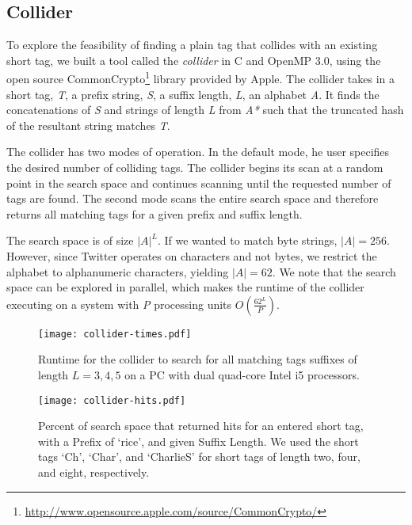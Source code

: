 \subsection{Collider}
\label{sec:collider}

To explore the feasibility of finding a plain tag that collides with an
existing short tag, we built a tool called the {\em collider} in C and
OpenMP 3.0, using the open source CommonCrypto\footnote{\url{http://www.opensource.apple.com/source/CommonCrypto/}} library provided
by Apple.
The collider takes in a short tag, \textit{T}, a prefix string,
\textit{S}, a suffix length, \textit{L}, an alphabet \textit{A}. It
finds the concatenations of \textit{S} and strings of length \textit{L}
from \textit{A*} such that the truncated hash of the resultant string
matches \textit{T}.

The collider has two modes of operation. In the default mode, he user
specifies the desired number of colliding tags. The collider begins its
scan at a random point in the search space and continues scanning until
the requested number of tags are found. The second mode scans the entire
search space and therefore returns all matching tags for a given prefix
and suffix length.

The search space is of size $|A|^L$. If we wanted to match byte strings,
$|A| = 256$. However, since Twitter operates on characters and not
bytes, we restrict the alphabet to alphanumeric characters, yielding
$|A| = 62$. We note that the search space can be explored in parallel,
which makes the runtime of the collider executing on a system with
\textit{P} processing units $O(\frac{62^L}{P})$.

\begin{figure}
\begin{center}
\texttt{[image: collider-times.pdf]}
\caption{Runtime for the collider to search for all matching tags
  suffixes of length $L=3,4,5$ on a PC with dual quad-core Intel i5
  processors.
\label{fig:collider-times}
}
\end{center}
\end{figure}

\begin{figure}
\begin{center}
\texttt{[image: collider-hits.pdf]}
\caption{Percent of search space that returned hits for an entered short
  tag, with a Prefix of `rice', and given Suffix Length. We used the
  short tags `Ch', `Char', and `CharlieS' for short tags of length two,
  four, and eight, respectively.
\label{fig:collider-hits}
}
\end{center}
\end{figure}

